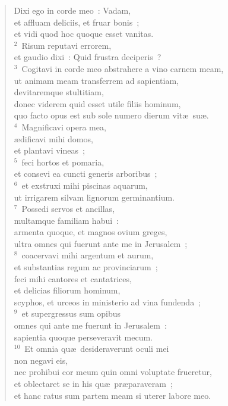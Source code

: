 \begin{flushleft}\begin{verse}\vspace{-19pt}Dixi ego in corde meo~: Vadam,\\ et affluam deliciis, et fruar bonis~;\\ et vidi quod hoc quoque esset vanitas.\\
${}^{2}$~Risum reputavi errorem,\\ et gaudio dixi~: Quid frustra deciperis~?\\
${}^{3}$~Cogitavi in corde meo abstrahere a vino carnem meam,\\ ut animam meam transferrem ad sapientiam,\\ devitaremque stultitiam,\\ donec viderem quid esset utile filiis hominum,\\ quo facto opus est sub sole numero dierum vit\ae\ su\ae .\\
${}^{4}$~Magnificavi opera mea,\\ \ae dificavi mihi domos,\\ et plantavi vineas~;\\
${}^{5}$~feci hortos et pomaria,\\ et consevi ea cuncti generis arboribus~;\\
${}^{6}$~et exstruxi mihi piscinas aquarum,\\ ut irrigarem silvam lignorum germinantium.\\
${}^{7}$~Possedi servos et ancillas,\\ multamque familiam habui~:\\ armenta quoque, et magnos ovium greges,\\ ultra omnes qui fuerunt ante me in Jerusalem~;\\
${}^{8}$~coacervavi mihi argentum et aurum,\\ et substantias regum ac provinciarum~;\\ feci mihi cantores et cantatrices,\\ et delicias filiorum hominum,\\ scyphos, et urceos in ministerio ad vina fundenda~;\\
${}^{9}$~et supergressus sum opibus\\ omnes qui ante me fuerunt in Jerusalem~:\\ sapientia quoque perseveravit mecum.\\
${}^{10}$~Et omnia qu\ae\ desideraverunt oculi mei\\ non negavi eis,\\ nec prohibui cor meum quin omni voluptate frueretur,\\ et oblectaret se in his qu\ae\ pr\ae paraveram~;\\ et hanc ratus sum partem meam si uterer labore meo.\\

\end{verse}
\end{flushleft}
